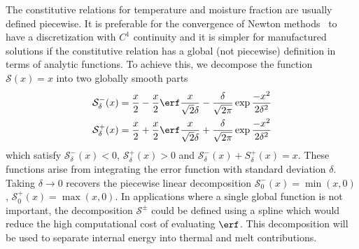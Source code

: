 The constitutive relations for temperature and moisture fraction are usually defined piecewise.
It is preferable for the convergence of Newton methods~\citep[\cf][]{gropp2000globalized,kelley1995iterative} to have a discretization with $C^1$ continuity and it is simpler for manufactured solutions if the constitutive relation has a global (\ie not piecewise) definition in terms of analytic functions.
To achieve this, we decompose the function $\mathcal{S}(x) = x$ into two globally smooth parts
\begin{equation}\label{eq:vhttransition}
  \begin{split}
    \mathcal S_\delta^-(x) &= \frac{x}{2} - \frac{x}{2} \erf \frac{x}{\sqrt 2 \delta} - \frac{\delta}{\sqrt{2\pi}} \exp{\frac{-x^{2}}{2 \delta^{2}}} \\
    \mathcal S_\delta^+(x) &= \frac{x}{2} + \frac{x}{2} \erf \frac{x}{\sqrt 2 \delta} + \frac{\delta}{\sqrt{2\pi}} \exp{\frac{-x^{2}}{2 \delta^{2}}}
  \end{split}
\end{equation}
which satisfy $\mathcal S_\delta^- (x) < 0$, $\mathcal S_\delta^+(x) > 0$ and $\mathcal S_\delta^-(x) + S_\delta^+(x) = x$.
These functions arise from integrating the error function with standard deviation $\delta$.
Taking $\delta\to 0$ recovers the piecewise linear decomposition $\mathcal S_0^-(x) = \min(x,0)$, $\mathcal S_0^+(x) = \max(x,0)$.
In applications where a single global function is not important, the decomposition $\mathcal S^\pm$ could be defined using a spline which would reduce the high computational cost of evaluating $\erf$.
This decomposition will be used to separate internal energy into thermal and melt contributions.

